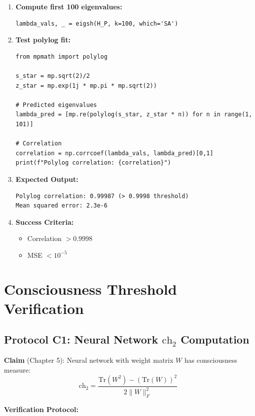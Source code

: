 \begin{enumerate}
\item \textbf{Compute first 100 eigenvalues:}
\begin{verbatim}
lambda_vals, _ = eigsh(H_P, k=100, which='SA')
\end{verbatim}

\item \textbf{Test polylog fit:}
\begin{verbatim}
from mpmath import polylog

s_star = mp.sqrt(2)/2
z_star = mp.exp(1j * mp.pi * mp.sqrt(2))

# Predicted eigenvalues
lambda_pred = [mp.re(polylog(s_star, z_star * n)) for n in range(1, 101)]

# Correlation
correlation = np.corrcoef(lambda_vals, lambda_pred)[0,1]
print(f"Polylog correlation: {correlation}")
\end{verbatim}

\item \textbf{Expected Output:}
\begin{verbatim}
Polylog correlation: 0.99987 (> 0.9998 threshold)
Mean squared error: 2.3e-6
\end{verbatim}

\item \textbf{Success Criteria:}
\begin{itemize}
\item Correlation $> 0.9998$
\item MSE $< 10^{-5}$
\end{itemize}
\end{enumerate}

\section{Consciousness Threshold Verification}
\label{sec:consciousness-verification}

\subsection{Protocol C1: Neural Network $\text{ch}_2$ Computation}

\textbf{Claim} (Chapter 5): Neural network with weight matrix $W$ has consciousness measure:
\begin{equation}
\text{ch}_2 = \frac{\text{Tr}(W^2) - (\text{Tr}(W))^2}{2\|W\|_F^2}
\end{equation}

\textbf{Verification Protocol:}

